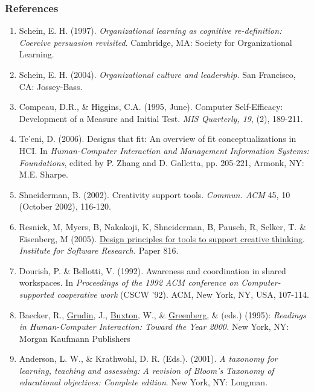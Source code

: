 \subsubsection{References}

\begin{enumerate}
\item
  Schein, E. H. (1997). \emph{Organizational learning as cognitive
  re-definition: Coercive persuasion revisited}. Cambridge, MA: Society
  for Organizational Learning.
\item
  Schein, E. H. (2004). \emph{Organizational culture and leadership.}
  San Francisco, CA: Jossey-Bass.
\item
  Compeau, D.R., \& Higgins, C.A. (1995, June). Computer Self-Efficacy:
  Development of a Measure and Initial Test. \emph{MIS Quarterly, 19},
  (2), 189-211.
\item
  Te'eni, D. (2006). Designs that fit: An overview of fit
  conceptualizations in HCI. In \emph{Human-Computer Interaction and
  Management Information Systems: Foundations}, edited by P. Zhang and
  D. Galletta, pp. 205-221, Armonk, NY: M.E. Sharpe.
\item
  Shneiderman, B. (2002). Creativity support tools. \emph{Commun. ACM}
  45, 10 (October 2002), 116-120.
\item
  Resnick, M, Myers, B, Nakakoji, K, Shneiderman, B, Pausch, R, Selker,
  T. \& Eisenberg, M (2005).
  \href{http://repository.cmu.edu/isr/816}{Design principles for tools
  to support creative thinking}. \emph{Institute for Software Research.}
  Paper 816.
\item
  Dourish, P. \& Bellotti, V. (1992). Awareness and coordination in
  shared workspaces. In \emph{Proceedings of the 1992 ACM conference on
  Computer-supported cooperative work} (CSCW '92). ACM, New York, NY,
  USA, 107-114.
\item
  Baecker, R.,
  \href{http://www.interaction-design.org/references/authors/jonathan\_grudin.html}{Grudin},
  J.,
  \href{http://www.interaction-design.org/references/authors/william\_buxton.html}{Buxton},
  W., \&
  \href{http://www.interaction-design.org/references/authors/saul\_greenberg.html}{Greenberg},
  \& (eds.) (1995): \emph{Readings in Human-Computer Interaction: Toward
  the Year 2000.} New York, NY: Morgan Kaufmann Publishers
\item
  Anderson, L. W., \& Krathwohl, D. R. (Eds.). (2001). \emph{A taxonomy
  for learning, teaching and assessing: A revision of Bloom's Taxonomy
  of educational objectives: Complete edition}. New York, NY: Longman.
\end{enumerate}

